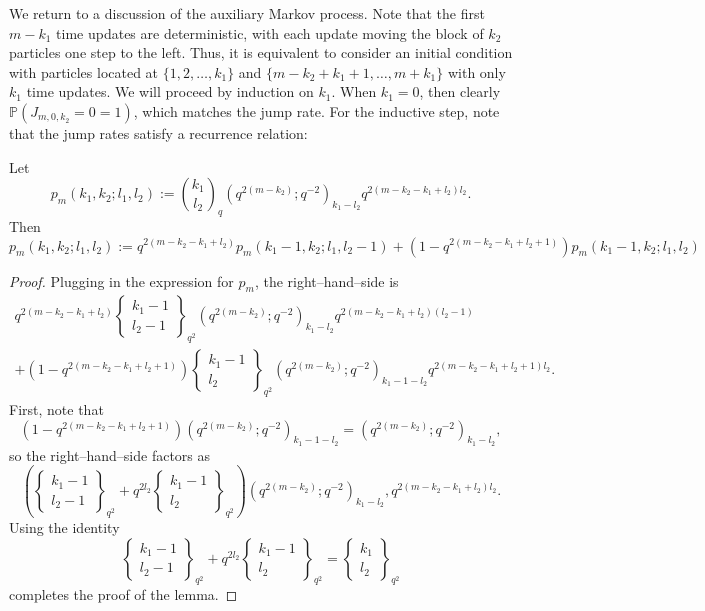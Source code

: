 \documentclass[12pt]{ximera}
\begin{document}
We return to a discussion of the auxiliary Markov process. Note that the first $m-k_1$ time updates are deterministic, with each update moving the block of $k_2$ particles one step to the left. Thus, it is equivalent to consider an initial condition with particles located at $\{1,2,\ldots,k_1\}$ and $\{m-k_2+k_1+1,\ldots,m+k_1\}$ with only $k_1$ time updates. We will proceed by induction on $k_1$. When $k_1=0$, then clearly $\mathbb{P}(J_{m,0,k_2}=0=1)$, which matches the jump rate. For the inductive step, note that the jump rates satisfy a recurrence relation:
\begin{lemma}\label{recur}
Let
$$
p_m(k_1,k_2;l_1,l_2):=\binom{k_1}{l_2}_q (q^{2(m-k_2)};q^{-2})_{k_1-l_2} q^{2(m-k_2-k_1+l_2)l_2}.
$$
Then
$$
p_m(k_1,k_2;l_1,l_2) := q^{2(m-k_2-k_1+l_2)} p_m(k_1-1,k_2;l_1,l_2-1) + (1-q^{2(m-k_2-k_1+l_2+1)}) p_m(k_1-1,k_2;l_1,l_2)
$$
\end{lemma}
\begin{proof}


Plugging in the expression for $p_m$, the right--hand--side is
\begin{multline*}
q^{2(m-k_2-k_1+l_2)}  \left\{ \begin{array}{c} k_1-1 \\ l_2-1 \end{array} \right\}_{q^2} (q^{2(m-k_2)};q^{-2})_{k_1-l_2} q^{2(m-k_2-k_1+l_2)(l_2-1)}  \\
+ (1-q^{2(m-k_2-k_1+l_2+1)}) \left\{ \begin{array}{c} k_1-1 \\ l_2 \end{array} \right\}_{q^2} (q^{2(m-k_2)};q^{-2})_{k_1-1-l_2}q^{2(m-k_2-k_1+l_2+1)l_2} .
\end{multline*}
First, note that
$$
(1-q^{2(m-k_2-k_1+l_2+1)}) (q^{2(m-k_2)};q^{-2})_{k_1-1-l_2} = (q^{2(m-k_2)};q^{-2})_{k_1-l_2},
$$
so the right--hand--side factors as 
$$
\left(  \left\{ \begin{array}{c} k_1-1 \\ l_2-1 \end{array} \right\}_{q^2} + q^{2l_2}\left\{ \begin{array}{c} k_1-1 \\ l_2 \end{array} \right\}_{q^2}   \right)(q^{2(m-k_2)};q^{-2})_{k_1-l_2}, q^{2(m-k_2-k_1+l_2)l_2} .
$$
Using the identity 
$$
 \left\{ \begin{array}{c} k_1-1 \\ l_2-1 \end{array} \right\}_{q^2} + q^{2l_2}\left\{ \begin{array}{c} k_1-1 \\ l_2 \end{array} \right\}_{q^2}  = \left\{ \begin{array}{c} k_1 \\ l_2 \end{array} \right\}_{q^2} 
$$
completes the proof of the lemma.
\end{proof}
\end{document}
